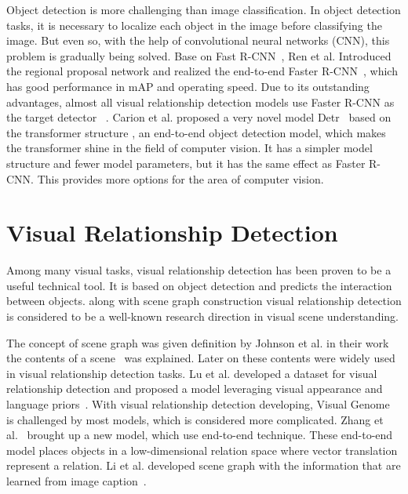 Object detection is more challenging than image classification. In object detection tasks, it is necessary to localize each object in the image before classifying the image. But even so, with the help of convolutional neural networks (CNN), this problem is gradually being solved. Base on Fast R-CNN~\cite{girshick2015fast}, Ren et al. Introduced the regional proposal network and realized the end-to-end Faster R-CNN~\cite{ren2016faster}, which has good performance in mAP and operating speed. Due to its outstanding advantages, almost all visual relationship detection models use Faster R-CNN as the target detector ~\cite{yang2018graph, zellers2018neural, zhang2019graphical}. Carion et al. proposed a very novel model Detr~\cite{carion2020end} based on the transformer structure , an end-to-end object detection model, which makes the transformer shine in the field of computer vision. It has a simpler model structure and fewer model parameters, but it has the same effect as Faster R-CNN. This provides more options for the area of computer vision.

\section{Visual Relationship Detection}
Among many visual tasks, visual relationship detection has been proven to be a useful technical tool. It is based on object detection and predicts the interaction between objects. along with scene graph construction visual relationship detection is considered to be a well-known research direction in visual scene understanding.

The concept of scene graph was given definition by Johnson et al. in their work the contents of a scene~\cite{johnson2015image} was explained. Later on these contents were widely used in visual relationship detection tasks. Lu et al. developed a dataset for visual relationship detection and proposed a model leveraging visual appearance and language priors~\cite{girshick2015fast}. With visual relationship detection developing, Visual Genome~\cite{krishna2017visual} is challenged by most models, which is considered more complicated. Zhang et al.~\cite{zhang2017visual} brought up a new model, which use end-to-end technique. These end-to-end model places objects in a low-dimensional relation space where vector translation represent a relation. Li et al. developed scene graph with the information that are learned from image caption~\cite{li2017scene}.

